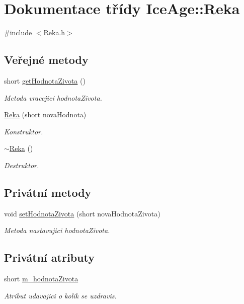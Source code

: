 \hypertarget{classIceAge_1_1Reka}{}\section{Dokumentace třídy Ice\+Age\+:\+:Reka}
\label{classIceAge_1_1Reka}


{\ttfamily \#include $<$Reka.\+h$>$}

\subsection*{Veřejné metody}
\begin{DoxyCompactItemize}
\item 
short \hyperlink{classIceAge_1_1Reka_acc4d9a4ef69da03eed8762e16a33b49f}{get\+Hodnota\+Zivota} ()
\begin{DoxyCompactList}\small\item\em Metoda vracejici hodnota\+Zivota. \end{DoxyCompactList}\item 
\hyperlink{classIceAge_1_1Reka_ac851511c842c8d8aa746be21562fd9c4}{Reka} (short nova\+Hodnota)
\begin{DoxyCompactList}\small\item\em Konstruktor. \end{DoxyCompactList}\item 
\hyperlink{classIceAge_1_1Reka_a7d29458f88fcd62378c9178b81ec2c51}{$\sim$\+Reka} ()
\begin{DoxyCompactList}\small\item\em Destruktor. \end{DoxyCompactList}\end{DoxyCompactItemize}
\subsection*{Privátní metody}
\begin{DoxyCompactItemize}
\item 
void \hyperlink{classIceAge_1_1Reka_a42bce1e2ee5f7249ee9800ca6058aab6}{set\+Hodnota\+Zivota} (short nova\+Hodnota\+Zivota)
\begin{DoxyCompactList}\small\item\em Metoda nastavujici hodnota\+Zivota. \end{DoxyCompactList}\end{DoxyCompactItemize}
\subsection*{Privátní atributy}
\begin{DoxyCompactItemize}
\item 
short \hyperlink{classIceAge_1_1Reka_acc162b1ee9e0678f92750a7e972460fa}{m\+\_\+hodnota\+Zivota}
\begin{DoxyCompactList}\small\item\em Atribut udavajici o kolik se uzdravis. \end{DoxyCompactList}\end{DoxyCompactItemize}


